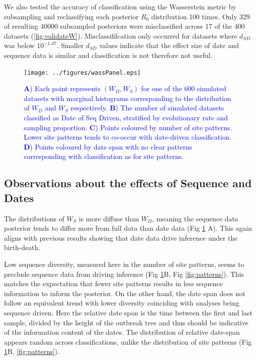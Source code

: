 \documentclass{article}
\begin{document}
We also tested the accuracy of classification using the Wasserstein metric by subsampling and reclassifying each posterior $R_0$ distribution 100 times. Only 329 of resulting 40000 subsampled posteriors were misclassified  across 17 of the 400 datasets (\ref{fig:validateW}). Misclassififcation only occurred for datasets where $d_{SD}$ was below $10^{-1.47}$. Smaller $d_{SD}$ values indicate that the effect size of date and sequence data is similar and classification is not therefore not useful.

\begin{figure}[H]
\centering
\texttt{[image: ../figures/wassPanel.eps]}
\caption{\textcolor{blue}{ \textbf{A}) Each point represents $(W_D, W_S)$ for one of the 600 simulated datasets with marginal histograms corresponding to the distribution of $W_D$ and $W_S$ respectively. \textbf{B}) The number of simulated datasets classified as Date of Seq Driven, stratified by evolutionary rate and sampling proportion. \textbf{C}) Points coloured by number of site patterns. Lower site patterns tends to co-occur with date-driven classification. \textbf{D}) Points coloured by date span with no clear patterns corresponding with classification as for site patterns. }}
\label{fig:wData}
\end{figure}

\subsection*{Observations about the effects of Sequence and Dates}
The distributions of $W_S$ is more diffuse than $W_D$, meaning the sequence data posterior tends to differ more from full data than date data (Fig \ref{fig:wData} A). This again aligns with previous results showing that date data drive inference under the birth-death.

Low sequence diversity, measured here in the number of site patterns, seems to preclude sequence data from driving inference (Fig \ref{fig:wData}B, Fig \ref{fig:patterns}). This matches the expectation that fewer site patterns results in less sequence information to inform the posterior. On the other hand, the date span  does not follow an equivalent trend with lower diversity coinciding with analyses being sequence driven. Here the relative date span is the time between the first and last sample, divided by the height of the outbreak tree and thus should be indicative of the information content of the dates. The distribution of relative date-span appears random across classifications, unlike the distribution of site patterns (Fig \ref{fig:wData}B, \ref{fig:patterns}).
\end{document}
